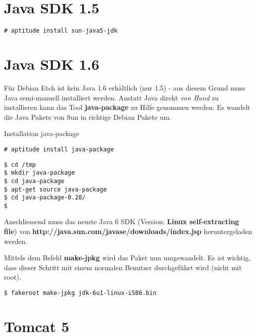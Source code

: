 \documentclass[a4paper,12pt,halfparskip,DIV14]{scrreprt}
\begin{document}

\section{Java SDK 1.5} %
\label{sec:java_sdk_1_5}

\begin{verbatim}
# aptitude install sun-java5-jdk
\end{verbatim}


\section{Java SDK 1.6} %
\label{sec:java_sdk}

Für Debian Etch ist kein Java 1.6 erhältlich (nur 1.5) - aus diesem Grund muss Java semi-manuell installiert werden. Anstatt Java direkt \emph{von Hand} zu installieren kann das Tool \textbf{java-package} zu Hilfe genommen werden. Es wandelt die Java Pakete von Sun in richtige Debian Pakete um. 

Installation java-package

\begin{verbatim}
# aptitude install java-package  
\end{verbatim}

\begin{verbatim}
$ cd /tmp
$ mkdir java-package
$ cd java-package
$ apt-get source java-package
$ cd java-package-0.28/
$
\end{verbatim}

Anschliessend muss das neuste Java 6 SDK (Version: \textbf{Linux self-extracting file}) von \textbf{http://java.sun.com/javase/downloads/index.jsp} heruntergeladen werden.


Mittels dem Befehl \textbf{make-jpkg} wird das Paket nun umgewandelt. Es ist wichtig, dass dieser Schritt mit einem normalen Benutzer durchgeführt wird (nicht mit root).

\begin{verbatim}
$ fakeroot make-jpkg jdk-6u1-linux-i586.bin 
\end{verbatim}


\section{Tomcat 5} %
\label{sec:tomcat_5}
\end{document}
